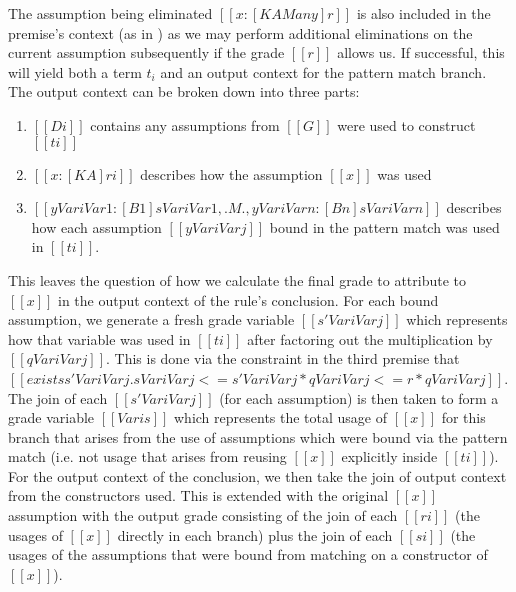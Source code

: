 The assumption being eliminated
$[[ x : [K {A Many}] r ]]$ is also included in the premise's context (as in \GRANULEdruleAppName) as we may perform
additional eliminations on the current assumption subsequently if the grade
$[[ r ]]$ allows us. If successful,
this will yield both a term $t_{i}$ and an output context for the
pattern match branch.
The output context can be broken down into three parts:
\begin{enumerate}
\item $[[ Di ]]$ contains any
assumptions from $[[ G ]]$ were used to construct $[[ ti ]]$
\item  $[[ x : [K A] ri ]]$ describes how the assumption $[[ x ]]$ was
used
\item $[[ {{y Vari Var1} : [B1] {s Vari Var1} } , .M. , {y Vari Varn} : [Bn] {s Vari Varn} ]]$ describes how each assumption  $[[ y Vari Varj ]]$ bound in the pattern
match was used in $[[ ti ]]$.
\end{enumerate}
%
This leaves the question of how we calculate the final grade to
attribute to $ [[ x ]]$  in the output context of the rule's conclusion.
For each bound assumption, we generate a fresh grade variable
$[[ s' Vari Varj  ]]$ which represents how that variable was used in $[[ ti ]]$
after factoring out the multiplication by $[[ q Vari Varj ]]$. This is done via the
constraint in the third premise that $ [[
exists {s' Vari Varj} . {s Vari Varj} <= {s' Vari Varj} * {q Vari Varj} <= r * {q Vari Varj} ]]$.
The join of each $[[ s' Vari Varj ]]$ (for each assumption) is then taken to
form a grade variable $[[ Vari s ]]$ which represents the total usage of
$[[ x ]]$ for this branch that arises from the use of assumptions which were
bound via the pattern match (i.e. not usage that arises from reusing $[[x]]$
explicitly inside $[[ ti ]]$). For the output context of the conclusion, we then
take the join of output context from the constructors used. This is extended
with the original $[[ x ]]$ assumption with the output grade consisting of the
join of each $[[ ri ]]$ (the usages of $[[ x ]]$ directly in each branch) plus
the join of each $[[ si ]]$ (the usages of the assumptions that were bound from
matching on a constructor of $[[ x ]]$).

